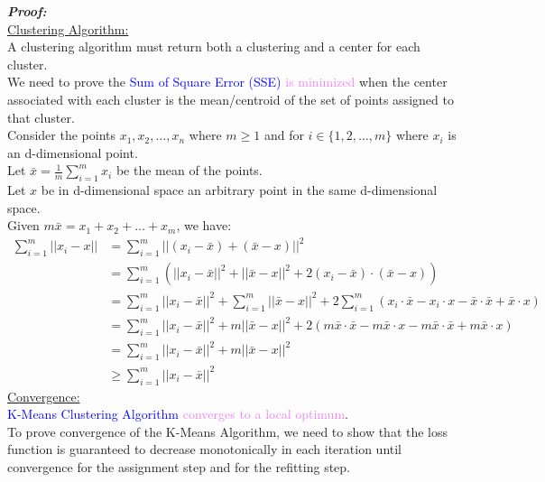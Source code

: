 \documentclass{book}
\begin{document}
\vspace{5mm}
\textbf{\large{\textit{Proof:}}}\\
\vspace{2mm}
\underline{Clustering Algorithm:}\\
\vspace{1mm}
A clustering algorithm must return both a clustering and a center for each cluster.\\
We need to prove the \textcolor{blue}{Sum of Square Error (SSE)} \textcolor{violet}{is minimized} when the center associated with each cluster is the mean/centroid of the set of points assigned to that cluster.\\
Consider the points \(x_1, x_2, \ldots, x_n\) where \(m \geq 1\) and for \( i \in \{1, 2, \ldots, m\}\) where \(x_i\) is an d-dimensional point.\\
\vspace{1mm}
Let \( \bar{x} = \frac{1}{m} \sum_{i=1}^{m} x_i\) be the mean of the points.\\
Let \(x\) be in d-dimensional space an arbitrary point in the same d-dimensional space.\\
\vspace{1mm}
Given \(m\bar{x} = x_1 + x_2 + \ldots + x_m\), we have:
\begin{align*}
    \sum_{i=1}^{m} ||x_i - x|| & = \sum_{i=1}^{m} ||(x_i - \bar{x}) + (\bar{x} - x)||^2 \\
    & = \sum_{i=1}^{m} (||x_i - \bar{x}||^2 + ||\bar{x} - x||^2 + 2(x_i - \bar{x}) \cdot (\bar{x} - x)) \\
    & = \sum_{i=1}^{m} ||x_i - \bar{x}||^2 + \sum_{i=1}^{m} ||\bar{x} - x||^2 + 2\sum_{i=1}^{m} (x_i \cdot \bar{x} - x_i \cdot x - \bar{x} \cdot \bar{x} + \bar{x} \cdot x) \\
    & = \sum_{i=1}^{m} ||x_i - \bar{x}||^2 + m||\bar{x} - x||^2 + 2(m\bar{x} \cdot \bar{x} - m\bar{x} \cdot x - m\bar{x} \cdot \bar{x} + m\bar{x} \cdot x) \\
    & = \sum_{i=1}^{m} ||x_i - \bar{x}||^2 + m||\bar{x} - x||^2 \\
    & \geq \sum_{i=1}^{m} ||x_i - \bar{x}||^2
\end{align*}
\newpage
\underline{Convergence:}\\
\vspace{1mm}
\textcolor{blue}{K-Means Clustering Algorithm} \textcolor{violet}{converges to a local optimum}.\\
To prove convergence of the K-Means Algorithm, we need to show that the loss function is guaranteed to decrease monotonically in each iteration until convergence for the assignment step and for the refitting step.\\
\end{document}
